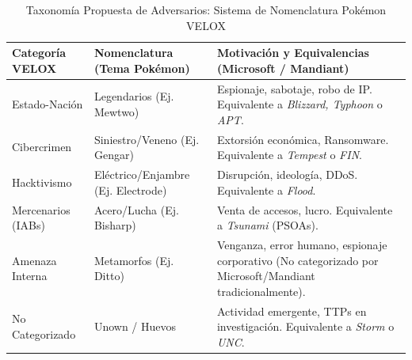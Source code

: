 \documentclass[letterpaper,11pt]{article}
\begin{document}
\vspace{0.4cm}
\begin{table}[H]
\centering
{}
\begin{tabular}{|p{3.5cm}|p{3.5cm}|p{8.0cm}|}
\hline
\rowcolor{blue!25}
\textbf{Categoría VELOX} & \textbf{Nomenclatura (Tema Pokémon)} & \textbf{Motivación y Equivalencias (Microsoft / Mandiant)} \\
\hline
Estado-Nación & Legendarios (Ej. Mewtwo) & Espionaje, sabotaje, robo de IP. Equivalente a \textit{Blizzard, Typhoon} o \textit{APT}. \\
\hline
Cibercrimen & Siniestro/Veneno (Ej. Gengar) & Extorsión económica, Ransomware. Equivalente a \textit{Tempest} o \textit{FIN}. \\
\hline
Hacktivismo & Eléctrico/Enjambre (Ej. Electrode) & Disrupción, ideología, DDoS. Equivalente a \textit{Flood}. \\
\hline
Mercenarios (IABs) & Acero/Lucha (Ej. Bisharp) & Venta de accesos, lucro. Equivalente a \textit{Tsunami} (PSOAs). \\
\hline
Amenaza Interna & Metamorfos (Ej. Ditto) & Venganza, error humano, espionaje corporativo (No categorizado por Microsoft/Mandiant tradicionalmente). \\
\hline
No Categorizado & Unown / Huevos & Actividad emergente, TTPs en investigación. Equivalente a \textit{Storm} o \textit{UNC}. \\
\hline
\end{tabular}
\caption{Taxonomía Propuesta de Adversarios: Sistema de Nomenclatura Pokémon VELOX}
\label{tab:taxonomia_pokemon_propia}
\end{table}

\newpage
\thispagestyle{empty}

\nocite{*}
\printbibliography[heading=bibintoc, title={Referencias}]
\end{document}
